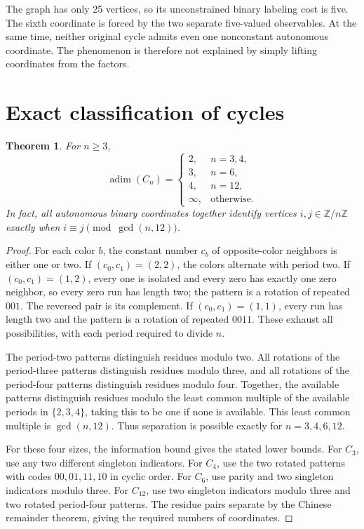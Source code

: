 \documentclass[11pt]{article}
\newtheorem{theorem}{Theorem}[section]
\theoremstyle{definition}
\newcommand{\adim}{\operatorname{adim}}
\numberwithin{equation}{section}
\begin{document}
The graph has only 25 vertices, so its unconstrained binary labeling cost
is five. The sixth coordinate is forced by the two separate five-valued
observables. At the same time, neither original cycle admits even one
nonconstant autonomous coordinate. The phenomenon is therefore not
explained by simply lifting coordinates from the factors.

\section{Exact classification of cycles}

\begin{theorem}\label{thm:cycles}
For $n\geq3$,
\[
 \adim(C_n)=
 \begin{cases}
 2,&n=3,4,\\
 3,&n=6,\\
 4,&n=12,\\
 \infty,&\text{otherwise}.
 \end{cases}
\]
In fact, all autonomous binary coordinates together identify vertices
$i,j\in\mathbb Z/n\mathbb Z$ exactly when
$i\equiv j\pmod{\gcd(n,12)}$.
\end{theorem}

\begin{proof}
For each color $b$, the constant number $c_b$ of opposite-color neighbors
is either one or two. If $(c_0,c_1)=(2,2)$, the colors alternate with
period two. If $(c_0,c_1)=(1,2)$, every one is isolated and every zero
has exactly one zero neighbor, so every zero run has length two; the
pattern is a rotation of repeated $001$. The reversed pair is its
complement. If $(c_0,c_1)=(1,1)$, every run has length two and the pattern
is a rotation of repeated $0011$. These exhaust all possibilities, with
each period required to divide $n$.

The period-two patterns distinguish residues modulo two. All rotations
of the period-three patterns distinguish residues modulo three, and all
rotations of the period-four patterns distinguish residues modulo four.
Together, the available patterns distinguish residues modulo the least
common multiple of the available periods in $\{2,3,4\}$, taking this to
be one if none is available. This least common multiple is $\gcd(n,12)$.
Thus separation is possible exactly for $n=3,4,6,12$.

For these four sizes, the information bound gives the stated lower
bounds. For $C_3$, use any two different singleton indicators. For
$C_4$, use the two rotated patterns with codes $00,01,11,10$ in cyclic
order. For $C_6$, use parity and two singleton indicators modulo three.
For $C_{12}$, use two singleton indicators modulo three and two rotated
period-four patterns. The residue pairs separate by the Chinese remainder
theorem, giving the required numbers of coordinates.
\end{proof}
\end{document}
